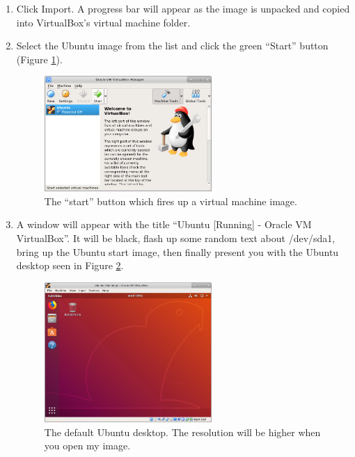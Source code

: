 \documentclass{lab}
\begin{document}
\begin{enumerate}
\item Click Import. A progress bar will appear as the image is unpacked and copied into VirtualBox's virtual machine folder.

\item Select the Ubuntu image from the list and click the green ``Start'' button (Figure \ref{fig:virtualbox2}).
\begin{figure}[H]
\begin{center}
\includegraphics[width=0.6\textwidth]{Wk1Images/ubuntu_start.png}
\end{center}
\caption{The ``start'' button which fires up a virtual machine image.}\label{fig:virtualbox2}
\end{figure}

\item A window will appear with the title ``Ubuntu [Running] - Oracle VM VirtualBox''. It will be black, flash up some random text about /dev/sda1, bring up the Ubuntu start image, then finally present you with the Ubuntu desktop seen in Figure \ref{fig:virtualbox3}.

\begin{figure}[H]
\begin{center}
\includegraphics[width=0.6\textwidth]{Wk1Images/ubuntu_desktop.png}
\end{center}
\caption{The default Ubuntu desktop. The resolution will be higher when you open my image.}\label{fig:virtualbox3}
\end{figure}


\end{enumerate}
\end{document}
